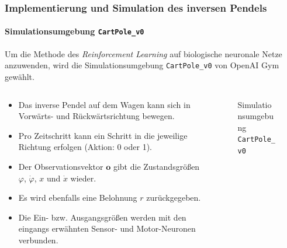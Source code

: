 \documentclass[10pt,t,aspectratio=1610]{beamer}
\newcommand{\ChapterCartpole}{Implementierung und Simulation des inversen Pendels}
\begin{document}
\begin{frame}
	\frametitle{\ChapterCartpole}
	\framesubtitle{Simulationsumgebung \texttt{CartPole\_v0}}
	\vspace{0.3cm}
	Um die Methode des \textit{Reinforcement Learning} auf biologische neuronale Netze anzuwenden, wird die Simulationsumgebung \texttt{CartPole\_v0} von OpenAI Gym gewählt.
	\vspace{0.1cm}
	\begin{columns}[T,onlytextwidth]
		\begin{column}{0.53\textwidth}
			\begin{itemize}
				\item Das inverse Pendel auf dem Wagen kann sich in Vorwärts- und Rückwärtsrichtung bewegen.
				\item Pro Zeitschritt kann ein Schritt in die jeweilige Richtung erfolgen (Aktion: 0 oder 1).
				\item Der Observationsvektor $\boldsymbol{o}$ gibt die Zustandsgrößen $\varphi$, $\dot{\varphi}$, $x$ und $\dot{x}$ wieder.
				\item Es wird ebenfalls eine Belohnung $r$ zurückgegeben.
				\item Die Ein- bzw. Ausgangsgrößen werden mit den eingangs erwähnten Sensor- und Motor-Neuronen verbunden.
			\end{itemize}
		\end{column}
		\hspace{-0.5cm}
		\begin{column}{0.45\textwidth}
			\vspace{-0.6cm}
			\begin{figure}[H] %
				\centering
				\scriptsize
				\def\svgwidth{6.5cm}
				
				\caption{Simulationsumgebung \texttt{CartPole\_v0}}
				\label{fig:cartpole}
			\end{figure}
		\end{column}
	\end{columns}
\end{frame}

\end{document}
